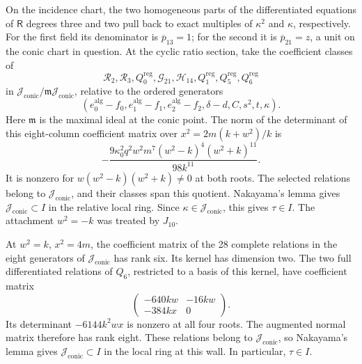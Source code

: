 \documentclass[11pt,a4paper]{article}
\numberwithin{equation}{section}
\theoremstyle{plain}
\theoremstyle{definition}
\theoremstyle{remark}
\begin{document}
On the incidence chart, the
two homogeneous parts of the differentiated equations of $\mathsf R$ degrees three and two pull
back to exact multiples of $\kappa^2$ and $\kappa$, respectively.
For the first field its denominator is $\overline p_{13}=1$; for the second
it is $\overline p_{21}=z$, a unit on the conic chart in question. 
At the cyclic ratio section, take the coefficient classes of
\[
 \mathcal R_2,\mathcal R_3,Q_0^{\mathrm{reg}},\mathcal G_{21},
 \mathcal H_{14},Q_1^{\mathrm{reg}},Q_5^{\mathrm{reg}},Q_6^{\mathrm{reg}}
\]
in $\mathcal J_{\mathrm{conic}}/\mathfrak m\mathcal J_{\mathrm{conic}}$,
relative to the ordered generators
\[
 (e_0^{\mathrm{alg}}-f_0,e_1^{\mathrm{alg}}-f_1,
  e_2^{\mathrm{alg}}-f_2,\delta-d,C,s^2,t,\kappa).
\]
Here $\mathfrak m$ is the maximal ideal at the conic point. The
norm of the determinant of this eight-column coefficient matrix
over $x^2=2m(k+w^2)/k$ is
\[
 -\frac{9\kappa_0^2q^2w^2m^7
          (w^2-k)^4(w^2+k)^{11}}{98k^{11}}.
\]
It is nonzero for $w(w^2-k)(w^2+k)\ne0$ at both roots.
The selected relations belong to $\mathcal J_{\mathrm{conic}}$,
and their classes span this quotient. Nakayama's lemma gives
$\mathcal J_{\mathrm{conic}}\subset I$ in the relative local
ring. Since $\kappa\in\mathcal J_{\mathrm{conic}}$, this gives
$\tau\in I$. The attachment $w^2=-k$ was treated by $J_{10}$.

At $w^2=k$, $x^2=4m$, the coefficient matrix of the 28
complete relations in the eight generators of
$\mathcal J_{\mathrm{conic}}$ has rank six. Its kernel has dimension
two. The two full differentiated relations of $Q_6$, restricted
to a basis of this kernel, have coefficient matrix
\[
 \begin{pmatrix}-640kw&-16kw\\-384kx&0\end{pmatrix}.
\]
Its determinant $-6144k^2wx$ is nonzero at all four roots.
The augmented normal matrix therefore has rank eight.
These relations belong to $\mathcal J_{\mathrm{conic}}$, so
Nakayama's lemma gives $\mathcal J_{\mathrm{conic}}\subset I$ in
the local ring at this wall. In particular, $\tau\in I$.
\end{document}
